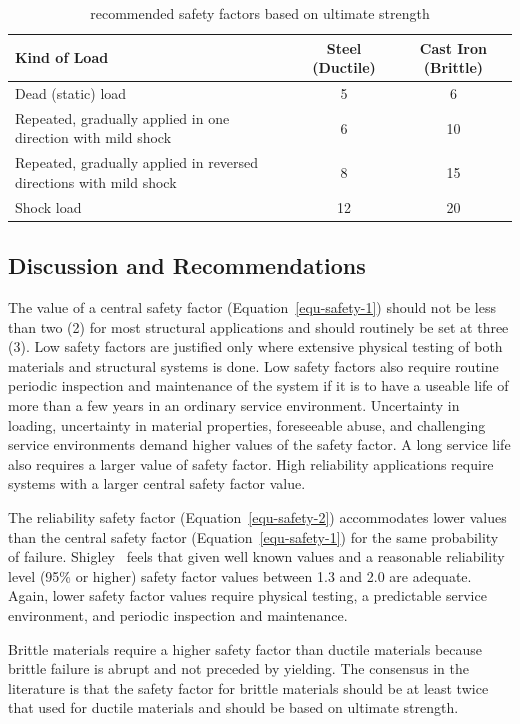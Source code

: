 \begin{table}
  \centering
  \small
  \begin{tabular}{p{} c c}
    \toprule
    Kind of Load & Steel (Ductile) & Cast Iron (Brittle) \\
    \midrule
    Dead (static) load & 5 & 6 \\
    Repeated, gradually applied in one direction with mild shock & 6 & 10 \\
    Repeated, gradually applied in reversed directions with mild shock & 8 & 15 \\
    Shock load & 12 & 20 \\
    \bottomrule
  \end{tabular}
  \caption{recommended safety factors based on ultimate strength}
\end{table}

\subsection{Discussion and Recommendations}

The value of a central safety factor (Equation~\ref{equ-safety-1}) should not be less than two (2) for most structural applications and should routinely be set at three (3). Low safety factors are justified only where extensive physical testing of both materials and structural systems is done. Low safety factors also require routine periodic inspection and maintenance of the system if it is to have a useable life of more than a few years in an ordinary service environment. Uncertainty in loading, uncertainty in material properties, foreseeable abuse, and challenging service environments demand higher values of the safety factor. A long service life also requires a larger value of safety factor. High reliability applications require systems with a larger central safety factor value.

The reliability safety factor (Equation~\ref{equ-safety-2}) accommodates lower values than the central safety factor (Equation~\ref{equ-safety-1}) for the same probability of failure. Shigley~\cite{joseph2001} feels that given well known values and a reasonable reliability level (95\% or higher) safety factor values between 1.3 and 2.0 are adequate. Again, lower safety factor values require physical testing, a predictable service environment, and periodic inspection and maintenance.

Brittle materials require a higher safety factor than ductile materials because brittle failure is abrupt and not preceded by yielding. The consensus in the literature is that the safety factor for brittle materials should be at least twice that used for ductile materials and should be based on ultimate strength.

